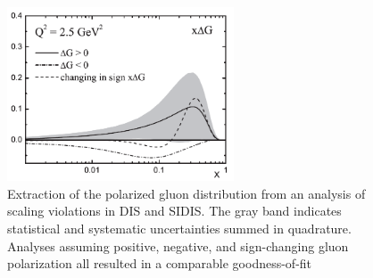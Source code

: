 
\begin{figure}
  \centering
  \includegraphics[width=0.6\textwidth]{figures/lss06_deltag}
  \caption{Extraction of the polarized gluon distribution from an analysis of
  scaling violations in DIS and SIDIS. The gray band indicates statistical and
  systematic uncertainties summed in quadrature. Analyses assuming positive,
  negative, and sign-changing gluon polarization all resulted in a comparable
  goodness-of-fit \cite{Leader:2006xc}}
\end{figure}

